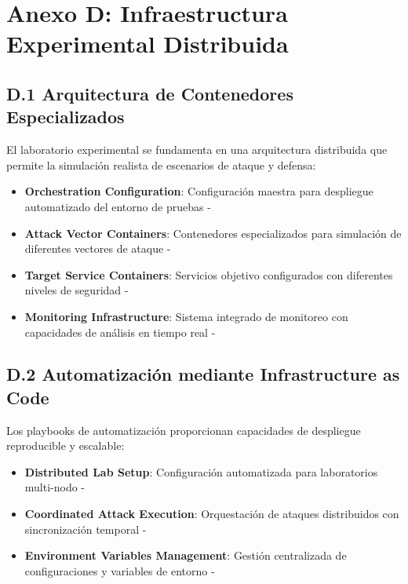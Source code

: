 \section*{Anexo D: Infraestructura Experimental Distribuida}

\subsection*{D.1 Arquitectura de Contenedores Especializados}
El laboratorio experimental se fundamenta en una arquitectura distribuida que permite la simulación realista de escenarios de ataque y defensa:
\begin{itemize}
    \item \textbf{Orchestration Configuration}: Configuración maestra para despliegue automatizado del entorno de pruebas - 
    \item \textbf{Attack Vector Containers}: Contenedores especializados para simulación de diferentes vectores de ataque - 
    \item \textbf{Target Service Containers}: Servicios objetivo configurados con diferentes niveles de seguridad - 
    \item \textbf{Monitoring Infrastructure}: Sistema integrado de monitoreo con capacidades de análisis en tiempo real - 
\end{itemize}

\subsection*{D.2 Automatización mediante Infrastructure as Code}
Los playbooks de automatización proporcionan capacidades de despliegue reproducible y escalable:
\begin{itemize}
    \item \textbf{Distributed Lab Setup}: Configuración automatizada para laboratorios multi-nodo - 
    \item \textbf{Coordinated Attack Execution}: Orquestación de ataques distribuidos con sincronización temporal - 
    \item \textbf{Environment Variables Management}: Gestión centralizada de configuraciones y variables de entorno - 
\end{itemize}

